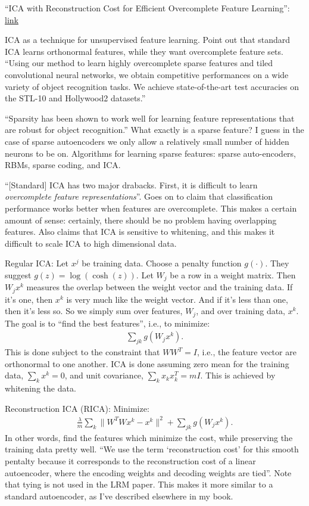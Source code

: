 \documentclass[12pt]{report}
\newcommand{\link}[2]{\href{#1}{#2}}
\begin{document}
``ICA with Reconstruction Cost for Efficient Overcomplete Feature
Learning'':
\link{http://ai.stanford.edu/~ang/papers/nips11-ICAReconstructionCost.pdf}{link}

ICA as a technique for unsupervised feature learning.  Point out that
standard ICA learns orthonormal features, while they want overcomplete
feature sets.  ``Using our method to learn highly overcomplete sparse
features and tiled convolutional neural networks, we obtain
competitive performances on a wide variety of object recognition
tasks.  We achieve state-of-the-art test accuracies on the STL-10 and
Hollywood2 datasets.''

``Sparsity has been shown to work well for learning feature
representations that are robust for object recognition.''  What
exactly is a sparse feature?  I guess in the case of sparse
autoencoders we only allow a relatively small number of hidden neurons
to be on.  Algorithms for learning sparse features: sparse
auto-encoders, RBMs, sparse coding, and ICA.

``[Standard] ICA has two major drabacks.  First, it is difficult to
learn \emph{overcomplete feature representations}''.  Goes on to claim
that classification performance works better when features are
overcomplete.  This makes a certain amount of sense: certainly, there
should be no problem having overlapping features.  Also claims that
ICA is sensitive to whitening, and this makes it difficult to scale
ICA to high dimensional data.

Regular ICA: Let $x^j$ be training data.  Choose a penalty function
$g(\cdot)$.  They suggest $g(z) = \log(\cosh(z))$.  Let $W_j$ be a row
in a weight matrix.  Then $W_j x^k$ measures the overlap between the
weight vector and the training data.  If it's one, then $x^k$ is very
much like the weight vector.  And if it's less than one, then it's
less so.  So we simply sum over features, $W_j$, and over training
data, $x^k$.  The goal is to ``find the best features'', i.e., to
minimize:
\begin{eqnarray}
  \sum_{jk} g(W_j x^k).
\end{eqnarray}
This is done subject to the constraint that $WW^T = I$, i.e., the
feature vector are orthonormal to one another.  ICA is done assuming
zero mean for the training data, $\sum_k x^k = 0$, and unit
covariance, $\sum_k x_k x_k^T = m I$.  This is achieved by whitening
the data.

Reconstruction ICA (RICA): Minimize:
\begin{eqnarray}
  \frac{\lambda}{m} \sum_k \| W^T W x^k - x^k\|^2 + \sum_{jk} g(W_j x^k).
\end{eqnarray}
In other words, find the features which minimize the cost, while
preserving the training data pretty well.  ``We use the term
`reconstruction cost' for this smooth pentalty because it corresponds
to the reconstruction cost of a linear autoencoder, where the encoding
weights and decoding weights are tied''.  Note that tying is not used
in the LRM paper.  This makes it more similar to a standard
autoencoder, as I've described elsewhere in my book.
\end{document}

